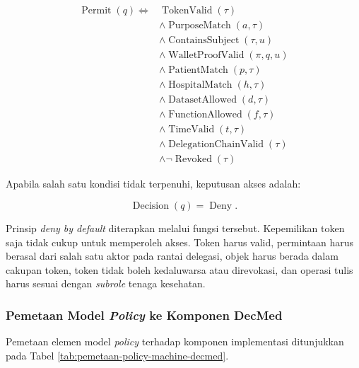 \begin{equation}
	\begin{split}
		\operatorname{Permit}(q)
		\iff {} &
		\operatorname{TokenValid}(\tau)                           \\
		        & \land \operatorname{PurposeMatch}(a,\tau)       \\
		        & \land \operatorname{ContainsSubject}(\tau,u)    \\
		        & \land \operatorname{WalletProofValid}(\pi,q,u)  \\
		        & \land \operatorname{PatientMatch}(p,\tau)       \\
		        & \land \operatorname{HospitalMatch}(h,\tau)      \\
		        & \land \operatorname{DatasetAllowed}(d,\tau)     \\
		        & \land \operatorname{FunctionAllowed}(f,\tau)    \\
		        & \land \operatorname{TimeValid}(t,\tau)          \\
		        & \land \operatorname{DelegationChainValid}(\tau) \\
		        & \land \neg\operatorname{Revoked}(\tau)
	\end{split}
	\label{eq:permit-akses}
\end{equation}

Apabila salah satu kondisi tidak terpenuhi, keputusan akses adalah:

\begin{equation}
	\operatorname{Decision}(q)=\operatorname{Deny}.
	\label{eq:deny-akses}
\end{equation}

Prinsip \textit{deny by default} diterapkan melalui fungsi tersebut. Kepemilikan token saja tidak cukup untuk memperoleh akses. Token harus valid, permintaan harus berasal dari salah satu aktor pada rantai delegasi, objek harus berada dalam cakupan token, token tidak boleh kedaluwarsa atau direvokasi, dan operasi tulis harus sesuai dengan \textit{subrole} tenaga kesehatan.

\subsubsection{Pemetaan Model \textit{Policy} ke Komponen DecMed}

Pemetaan elemen model \textit{policy} terhadap komponen implementasi ditunjukkan pada Tabel \ref{tab:pemetaan-policy-machine-decmed}.

